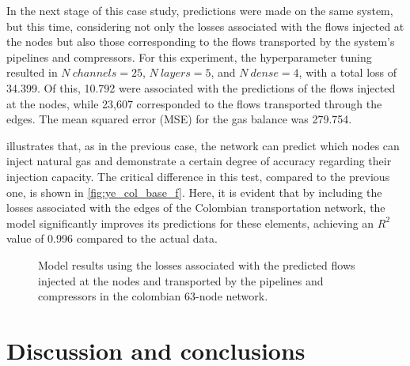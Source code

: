 %
%
%
%
%


In the next stage of this case study, predictions were made on the same system, but this time, considering not only the losses associated with the flows injected at the nodes but also those corresponding to the flows transported by the system's pipelines and compressors. For this experiment, the hyperparameter tuning resulted in $N \ channels = 25$, $N \ layers = 5$, and $N \ dense = 4$, with a total loss of 34.399. Of this, 10.792 were associated with the predictions of the flows injected at the nodes, while 23,607 corresponded to the flows transported through the edges. The mean squared error (MSE) for the gas balance was 279.754.

 illustrates that, as in the previous case, the network can predict which nodes can inject natural gas and demonstrate a certain degree of accuracy regarding their injection capacity. The critical difference in this test, compared to the previous one, is shown in \cref{fig:ye_col_base_f}. Here, it is evident that by including the losses associated with the edges of the Colombian transportation network, the model significantly improves its predictions for these elements, achieving an $R^2$ value of 0.996 compared to the actual data.


\begin{figure}
    \centering
        \setlength{}        
        \setlength{} 
        \caption{Model results using the losses associated with the predicted flows injected at the nodes and transported by the pipelines and compressors in the colombian 63-node network.}\label{fig:colombian_base_f_results}
\end{figure}




\section{Discussion and conclusions}
